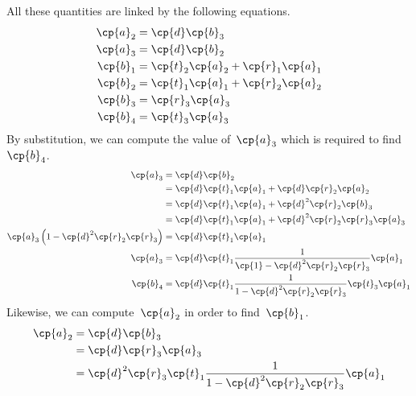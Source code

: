 \begin{refsection}
All these quantities are linked by the following equations.
\begin{subequations}
    \begin{align}
    \cp{a}_2 &= \cp{d} \cp{b}_3                       \label{eq:cavity_rel_a2} \\
    \cp{a}_3 &= \cp{d} \cp{b}_2                       \label{eq:cavity_rel_a3} \\
    \cp{b}_1 &= \cp{t}_2 \cp{a}_2 + \cp{r}_1 \cp{a}_1 \label{eq:cavity_rel_b1} \\
    \cp{b}_2 &= \cp{t}_1 \cp{a}_1 + \cp{r}_2 \cp{a}_2 \label{eq:cavity_rel_b2} \\
    \cp{b}_3 &= \cp{r}_3 \cp{a}_3                     \label{eq:cavity_rel_b3} \\
    \cp{b}_4 &= \cp{t}_3 \cp{a}_3                     \label{eq:cavity_rel_b4}
    \end{align}
\end{subequations}
By substitution, we can compute the value of~$\cp{a}_3$ which is required to find~$\cp{b}_4$.
\begin{align}
    \cp{a}_3
    &= \cp{d} \cp{b}_2                                                 \notag \\
    &= \cp{d} \cp{t}_1 \cp{a}_1 + \cp{d}   \cp{r}_2 \cp{a}_2           \notag \\
    &= \cp{d} \cp{t}_1 \cp{a}_1 + \cp{d}^2 \cp{r}_2 \cp{b}_3           \notag \\
    &= \cp{d} \cp{t}_1 \cp{a}_1 + \cp{d}^2 \cp{r}_2 \cp{r}_3 \cp{a}_3  \notag
    \\
    \cp{a}_3 \left(1 - \cp{d}^2 \cp{r}_2 \cp{r}_3 \right)
    &=
    \cp{d} \cp{t}_1 \cp{a}_1
    \notag
    \\
    \cp{a}_3
    &=
    \cp{d} \cp{t}_1 \frac{1}{\cp{1} - \cp{d}^2 \cp{r}_2 \cp{r}_3} \cp{a}_1
    \notag
    \\
    \cp{b}_4
    &=
    \cp{d} \cp{t}_1 \frac{1}{1 - \cp{d}^2 \cp{r}_2 \cp{r}_3} \cp{t}_3 \cp{a}_1
    \label{eq:cavity_b4_a1}
\end{align}
Likewise, we can compute~$\cp{a}_2$ in order to find~$\cp{b}_1$.
\begin{align}
    \cp{a}_2
    &=
    \cp{d} \cp{b}_3                                     
    \notag
    \\
    &=
    \cp{d} \cp{r}_3 \cp{a}_3
    \notag
    \\
    &=
    \cp{d}^2 \cp{r}_3 \cp{t}_1 \frac{1}{1 - \cp{d}^2 \cp{r}_2 \cp{r}_3} \cp{a}_1
    \notag
    \\

\end{align}
\end{refsection}
